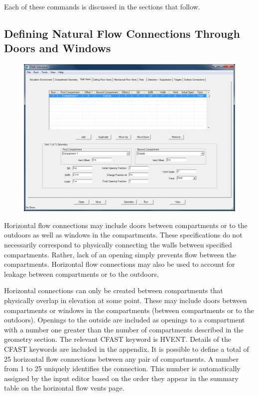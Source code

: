 Each of these commands is discussed in the sections that follow.

\subsection{Defining Natural Flow Connections Through Doors and Windows}

\begin{figure}[h!]
\includegraphics[width=6.5in]{FIGURES/Input_File/Natural_Flow_Tab}
\end{figure}

Horizontal flow connections may include doors between compartments or to the outdoors as well as windows in the compartments.  These specifications do not necessarily correspond to physically connecting the walls between specified compartments.  Rather, lack of an opening simply prevents flow between the compartments.  Horizontal flow connections may also be used to account for leakage between compartments or to the outdoors.

Horizontal connections can only be created between compartments that physically overlap in elevation at some point. These may include doors between compartments or windows in the compartments (between compartments or to the outdoors).  Openings to the outside are included as openings to a compartment with a number one greater than the number of compartments described in the geometry section.  The relevant CFAST keyword is HVENT.  Details of the CFAST keywords are included in the appendix. It is possible to define a total of 25 horizontal flow connections between any pair of compartments. A number from 1 to 25 uniquely identifies the connection. This number is automatically assigned by the input editor based on the order they appear in the summary table on the horizontal flow vents page.

